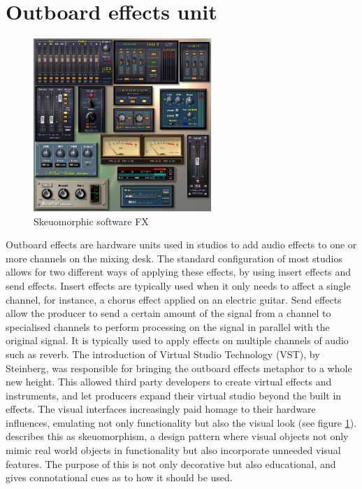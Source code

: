 \documentclass[12pt]{report}
\begin{document}
\section{Outboard effects unit}
\label{sec:orgf4bd48e}
\begin{LATEX}
\begin{figure}[h]
\centering
\includegraphics[width=0.6\textwidth]{./assets/fx.jpg}
\caption{Skeuomorphic software FX}
\label{fig:fx}
\end{figure}
\label{orgf63e9fb}
\end{LATEX}
Outboard effects are hardware units used in studios to add audio effects to one
or more channels on the mixing desk. The standard configuration of most studios
allows for two different ways of applying these effects, by using insert effects
and send effects. Insert effects are typically used when it only needs to affect
a single channel, for instance, a chorus effect applied on an electric guitar.
Send effects allow the producer to send a certain amount of the signal from a
channel to specialised channels to perform processing on the signal in parallel
with the original signal. It is typically used to apply effects on multiple
channels of audio such as reverb. The introduction of Virtual Studio Technology
(VST), by Steinberg, was responsible for bringing the outboard effects metaphor
to a whole new height. This allowed third party developers to create virtual
effects and instruments, and let producers expand their virtual studio beyond
the built in effects. The visual interfaces increasingly paid homage to their
hardware influences, emulating not only functionality but also the visual look
(see figure \ref{fig:fx}). \citet{levin_painterly_2000} describes this as
skeuomorphism, a design pattern where visual objects not only mimic real world
objects in functionality but also incorporate unneeded visual features. The
purpose of this is not only decorative but also educational, and gives
connotational cues as to how it should be used.
\end{document}
